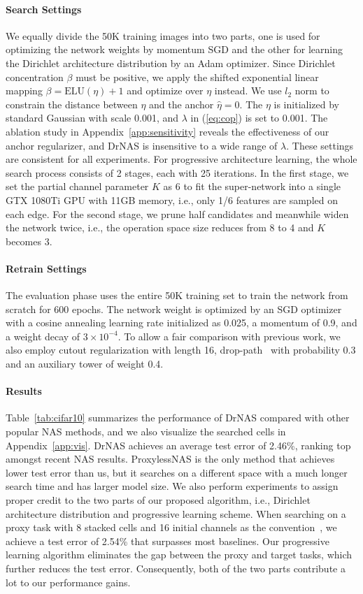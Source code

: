 \documentclass{article} \usepackage{iclr2021_conference,times}
\begin{document}
\paragraph{Search Settings}
We equally divide the 50K training images into two parts, one is used for optimizing the network weights by momentum SGD and the other for learning the Dirichlet architecture distribution by an Adam optimizer.
Since Dirichlet concentration $\beta$ must be positive, we apply the shifted exponential linear mapping $\beta = \text{ELU}(\eta) + 1$ and optimize over $\eta$ instead.
We use $l_2$ norm to constrain the distance between $\eta$ and the anchor $\hat\eta = 0$.
The $\eta$ is initialized by standard Gaussian with scale 0.001, and $\lambda$ in (\ref{eq:cop}) is set to 0.001.
The ablation study in Appendix~\ref{app:sensitivity} reveals the effectiveness of our anchor regularizer, and DrNAS is insensitive to a wide range of $\lambda$. 
These settings are consistent for all experiments.
For progressive architecture learning, the whole search process consists of 2 stages, each with 25 iterations. 
In the first stage, we set the partial channel parameter $K$ as 6 to fit the super-network into a single GTX 1080Ti GPU with 11GB memory, i.e., only 1/6 features are sampled on each edge.
For the second stage, we prune half candidates and meanwhile widen the network twice, i.e., the operation space size reduces from 8 to 4 and $K$ becomes 3.

\paragraph{Retrain Settings}
The evaluation phase uses the entire 50K training set to train the network from scratch for 600 epochs.
The network weight is optimized by an SGD optimizer with a cosine annealing learning rate initialized as 0.025, a momentum of 0.9, and a weight decay of $3\times 10^{-4}$.
To allow a fair comparison with previous work, we also employ cutout regularization with length 16, drop-path~\citep{nasnet} with probability 0.3 and an auxiliary tower of weight 0.4. 

\paragraph{Results}
Table~\ref{tab:cifar10} summarizes the performance of DrNAS compared with other popular NAS methods, and we also visualize the searched cells in Appendix~\ref{app:vis}. 
DrNAS achieves an average test error of 2.46\%, ranking top amongst recent NAS results.
ProxylessNAS is the only method that achieves lower test error than us, but it searches on a different space with a much longer search time and has larger model size.
We also perform experiments to assign proper credit to the two parts of our proposed algorithm, i.e., Dirichlet architecture distribution and progressive learning scheme.
When searching on a proxy task with 8 stacked cells and 16 initial channels as the convention~\citep{darts,pcdarts}, we achieve a test error of 2.54\% that surpasses most baselines. 
Our progressive learning algorithm eliminates the gap between the proxy and target tasks, which further reduces the test error.
Consequently, both of the two parts contribute a lot to our performance gains.
\end{document}
